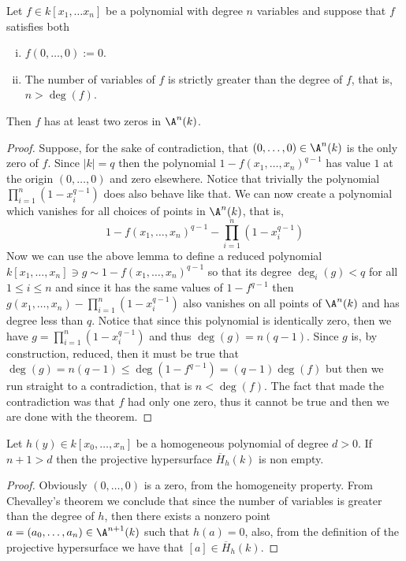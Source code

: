 \begin{theorem}[Chevalley]
   Let \(f \in k[x_1, \dots x_n]\) be a polynomial with degree \(n\) variables
   and suppose that \(f\) satisfies both
   \begin{enumerate}[i.]
      \item \(f(0, \dots, 0) := 0\).
      \item The number of variables of \(f\) is strictly greater than the
         degree of \(f\), that is, \(n > \deg(f)\).
   \end{enumerate}
   Then \(f\) has at least two zeros in \(\A^n(k)\).
\end{theorem}

\begin{proof}
   Suppose, for the sake of contradiction, that \((0, \dots, 0) \in \A^n(k)\) is
   the only zero of \(f\). Since \(|k| = q\) then the polynomial \(1 - f(x_1,
   \dots, x_n)^{q-1}\) has value \(1\) at the origin \((0, \dots, 0)\) and zero
   elsewhere. Notice that trivially the polynomial \(\prod_{i=1}^{n}
   (1-x_i^{q-1})\) does also behave like that. We can now create a polynomial
   which vanishes for all choices of points in \(\A^n(k)\), that is, 
   \[
      1 - f(x_1,\dots,x_n)^{q-1} - \prod_{i=1}^{n} (1 - x_i^{q-1})
   \]
   Now we can use the above lemma to define a reduced polynomial \(k[x_1, \dots,
   x_n] \ni g \sim 1 - f(x_1, \dots, x_n)^{q-1}\) so that its degree \(\deg_i(g)
   < q\) for all \(1 \leqslant i \leqslant n\) and since it has the same values
   of \(1 - f^{q-1}\) then \(g(x_1, \dots, x_n) - \prod_{i=1}^n(1-x_i^{q-1})\)
   also vanishes on all points of \(\A^n(k)\) and has degree less than \(q\).
   Notice that since this polynomial is identically zero, then we have \(g =
   \prod_{i=1}^n (1 - x_i^{q-1})\) and thus \(\deg(g) = n(q-1)\). Since \(g\)
   is, by construction, reduced, then it must be true that \(\deg(g) = n(q-1)
   \leqslant \deg(1 - f^{q-1}) = (q-1)\deg(f)\) but then we run straight to a
   contradiction, that is \(n < \deg(f)\). The fact that made the contradiction
   was that \(f\) had only one zero, thus it cannot be true and then we are done
   with the theorem.
\end{proof}

\begin{corollary}
   Let \(h(y) \in k[x_0, \dots, x_n]\) be a homogeneous polynomial of degree \(d
   > 0\). If \(n + 1 > d\) then the projective hypersurface \(\overline{H}_h(k)\)
   is non empty.
\end{corollary}

\begin{proof}
   Obviously \((0, \dots, 0)\) is a zero, from the homogeneity property. From
   Chevalley's theorem we conclude that since the number of variables is greater
   than the degree of  \(h\), then there exists a nonzero point \(a = (a_0, \dots,
   a_n) \in \A^{n+1}(k)\) such that \(h(a) = 0\), also, from the definition of
   the projective hypersurface we have that \([a]  \in \overline{H}_h(k)\).
\end{proof}
